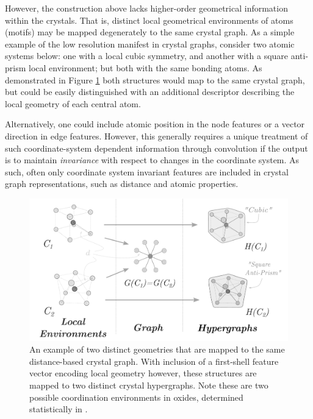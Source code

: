 \documentclass[twoside,twocolumn,9pt]{article}
\begin{document}



However, the construction above lacks higher-order geometrical information within the crystals. That is, distinct local geometrical environments of atoms (motifs) may be mapped degenerately to the same crystal graph.
As a simple example of the low resolution manifest in crystal graphs, consider two atomic systems below: one with a local cubic symmetry, and another with a square anti-prism local environment; but both with the same bonding atoms. As demonstrated in Figure \ref{fig:graph_cntex} both structures would map to the same crystal graph, but could be easily distinguished with an additional descriptor describing the local geometry of each central atom.

Alternatively, one could include atomic position in the node features or a vector direction in edge features. However, this generally requires a unique treatment of such coordinate-system dependent information through convolution if the output is to maintain \textit{invariance} with respect to changes in the coordinate system. As such, often only coordinate system invariant features are included in crystal graph representations, such as distance and atomic properties. 

\begin{figure}
	\centering
	\includegraphics[scale=0.7]{graph2hgraph_tall_revise2.pdf}
	\caption{An example of two distinct geometries that are mapped to the same distance-based crystal graph. With inclusion of a first-shell feature vector encoding local geometry however, these structures are mapped to two distinct crystal hypergraphs. Note these are two possible coordination environments in oxides, determined statistically in \cite{motifstats}.}
	\label{fig:graph_cntex}
\end{figure}
\end{document}
